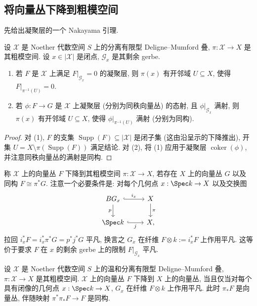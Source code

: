 \subsection{将向量丛下降到粗模空间}\label{src:5.4.5-subsection}
先给出凝聚层的一个 Nakayama 引理.
\begin{lemma}\label{src:5.4.26}
设 $\mathcal X$ 是 Noether 代数空间 $S$ 上的分离有限型 Deligne--Mumford 叠, $\pi:\mathcal X\to X$ 是其粗模空间. 设 $x\in|\mathcal X|$ 是闭点, $\mathcal G_x$ 是其剩余 gerbe.
\begin{enumerate}[(1)]
\item 若 $F$ 是 $\mathcal X$ 上满足 $F|_{\mathcal G_x}=0$ 的凝聚层, 则 $\pi(x)$ 有开邻域 $U\subseteq X$, 使得 $F|_{\pi^{-1}(U)}=0$.
\item 若 $\phi:F\to G$ 是 $\mathcal X$ 上凝聚层 (分别为同秩向量丛) 的态射, 且 $\phi|_{\mathcal G_x}$ 满射, 则 $\pi(x)$ 有开邻域 $U\subseteq X$, 使得 $\phi|_{\pi^{-1}(U)}$ 满射 (分别为同构).
\end{enumerate}
\end{lemma}
\begin{proof}
对 (1), $F$ 的支集 $\operatorname{Supp}(F)\subseteq|\mathcal X|$ 是闭子集 (这由沿呈示的下降推出), 开集 $U=X\setminus\pi(\operatorname{Supp}(F))$ 满足结论. 对 (2), 将 (1) 应用于凝聚层 $\operatorname{coker}(\phi)$, 并注意同秩向量丛的满射是同构.
\end{proof}
称 $\mathcal X$ 上的向量丛 $F$ 下降到其粗模空间 $\pi:\mathcal X\to X$, 若存在 $X$ 上的向量丛 $G$ 以及同构 $F\cong\pi^*G$. 注意一个必要条件是: 对每个几何点 $x:\Spec k\to\mathcal X$ 以及交换图
\[
\begin{tikzcd}
BG_x\arrow[r,hook,"i_x"]\arrow[d,"p"']&\mathcal X\arrow[d,"\pi"]\\
\Spec k\arrow[r,hook,"j"']&X,
\end{tikzcd}
\]
拉回 $i_x^*F=i_x^*\pi^*G=p^*j^*G$ 平凡, 换言之 $G_x$ 在纤维 $F\otimes k:=i_x^*F$ 上作用平凡. 这等价于要求 $F$ 在 $x$ 的剩余 gerbe 上的限制 $F|_{\mathcal G_x}$ 平凡.
\begin{proposition}\label{src:5.4.27}
设 $\mathcal X$ 是 Noether 代数空间 $S$ 上的温和分离有限型 Deligne--Mumford 叠, $\pi:\mathcal X\to X$ 是其粗模空间. $\mathcal X$ 上的向量丛 $F$ 下降到 $X$ 上的向量丛, 当且仅当对每个具有闭像的几何点 $x:\Spec k\to\mathcal X$, $G_x$ 在纤维 $F\otimes k$ 上作用平凡. 此时 $\pi_*F$ 是向量丛, 伴随映射 $\pi^*\pi_*F\to F$ 是同构.
\end{proposition}
